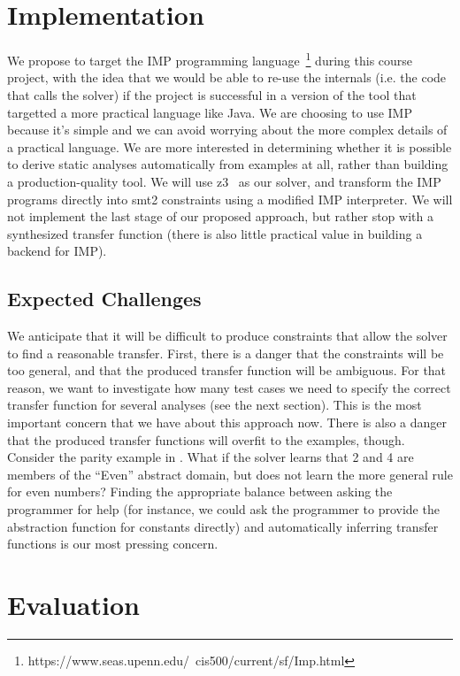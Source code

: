 \documentclass[10pt,conference]{IEEEtran}
\begin{document}
\section{Implementation}

We propose to target the IMP programming language~\footnote{https://www.seas.upenn.edu/~cis500/current/sf/Imp.html}
during this course project, with the idea that we would be able to re-use the internals
(i.e. the code that calls the solver) if the project is successful in
a version of the tool that targetted a more practical language like Java.
We are choosing to use IMP because it's simple and we can avoid worrying
about the more complex details of a practical language. We are more interested
in determining whether it is possible to derive static analyses automatically
from examples at all, rather than building a production-quality tool.
We will use z3~\cite{z3} as our solver, and transform the IMP programs directly
into smt2 constraints using a modified IMP interpreter.
We will not
implement the last stage of our proposed approach, but rather stop with a
synthesized transfer function (there is also little practical value in building
a backend for IMP).

\subsection{Expected Challenges}

We anticipate that it will be difficult to produce constraints that allow
the solver to find a reasonable transfer. First, there is a danger that
the constraints will be too general, and that the produced transfer
function will be ambiguous. For that reason, we want to investigate
how many test cases we need to specify the correct transfer function
for several analyses (see the next section). This is the most important
concern that we have about this approach now. There is also a danger
that the produced transfer functions will overfit to the examples,
though. Consider the parity example in . What if the solver
learns that 2 and 4 are members of the ``Even'' abstract domain, but
does not learn the more general rule for even numbers? Finding the
appropriate balance between asking the programmer for help (for instance,
we could ask the programmer to provide the abstraction function for
constants directly) and automatically inferring transfer functions
is our most pressing concern.

\section{Evaluation}
\end{document}
